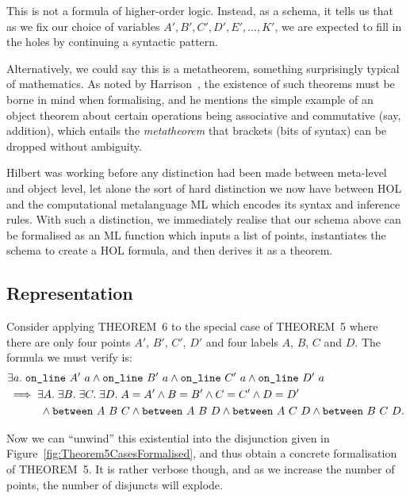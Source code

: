 This is not a formula of higher-order logic. Instead, as a schema, it tells us that as we fix our choice of variables $A', B', C', D', E', \ldots, K'$, we are expected to fill in the holes by continuing a syntactic pattern.

Alternatively, we could say this is a metatheorem, something surprisingly typical of mathematics. As noted by Harrison~\cite{FormalizedMathematics}, the existence of such theorems must be borne in mind when formalising, and he mentions the simple example of an object theorem about certain operations being associative and commutative (say, addition), which entails the \emph{metatheorem} that brackets (bits of syntax) can be dropped without ambiguity.

Hilbert was working before any distinction had been made between meta-level and object level, let alone the sort of hard distinction we now have between HOL and the computational metalanguage ML which encodes its syntax and inference rules. With such a distinction, we immediately realise that our schema above can be formalised as an ML function which inputs a list of points, instantiates the schema to create a HOL formula, and then derives it as a theorem.

\subsection{Representation}
Consider applying THEOREM~6 to the special case of THEOREM~5 where there are only four points $A'$, $B'$, $C'$, $D'$ and four labels $A$, $B$, $C$ and $D$. The formula we must verify is:
\begin{equation*}
  \begin{split}
    &\exists a.\;\code{on\_line}\ A'\ a\wedge\code{on\_line}\ B'\ a\wedge\code{on\_line}\ C'\ a\wedge\code{on\_line}\ D'\ a\\
    &\implies\exists A.\;\exists B.\;\exists C.\;\exists D.\; A = A' \wedge B = B' \wedge C = C' \wedge D = D'\\
    &\qquad\quad\wedge\between{A}{B}{C} \wedge \between{A}{B}{D}\wedge\between{A}{C}{D}\wedge\between{B}{C}{D}.
  \end{split}
\end{equation*} 

Now we can ``unwind'' this existential into the disjunction given in Figure~\ref{fig:Theorem5CasesFormalised}, and thus obtain a concrete formalisation of THEOREM~5. It is rather verbose though, and as we increase the number of points, the number of disjuncts will explode. 

